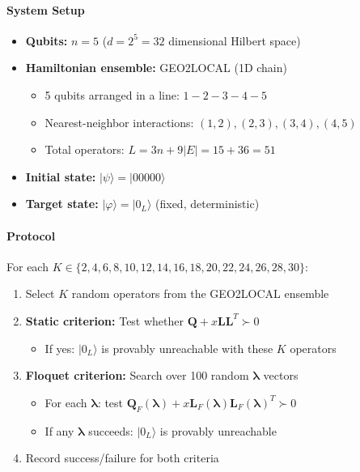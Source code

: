 \paragraph{System Setup}
\begin{itemize}
\item \textbf{Qubits:} $n = 5$ ($d = 2^5 = 32$ dimensional Hilbert space)
\item \textbf{Hamiltonian ensemble:} GEO2LOCAL (1D chain)
  \begin{itemize}
  \item 5 qubits arranged in a line: $1-2-3-4-5$
  \item Nearest-neighbor interactions: $(1,2), (2,3), (3,4), (4,5)$
  \item Total operators: $L = 3n + 9|E| = 15 + 36 = 51$
  \end{itemize}
\item \textbf{Initial state:} $|\psi\rangle = |00000\rangle$
\item \textbf{Target state:} $|\varphi\rangle = |0_L\rangle$ (fixed, deterministic)
\end{itemize}

\paragraph{Protocol}

For each $K \in \{2, 4, 6, 8, 10, 12, 14, 16, 18, 20, 22, 24, 26, 28, 30\}$:
\begin{enumerate}
\item Select $K$ random operators from the GEO2LOCAL ensemble
\item \textbf{Static criterion:} Test whether $\mathbf{Q} + x \mathbf{L} \mathbf{L}^T \succ 0$
  \begin{itemize}
  \item If yes: $|0_L\rangle$ is provably unreachable with these $K$ operators
  \end{itemize}
\item \textbf{Floquet criterion:} Search over 100 random $\boldsymbol{\lambda}$ vectors
  \begin{itemize}
  \item For each $\boldsymbol{\lambda}$: test $\mathbf{Q}_F(\boldsymbol{\lambda}) + x \mathbf{L}_F(\boldsymbol{\lambda}) \mathbf{L}_F(\boldsymbol{\lambda})^T \succ 0$
  \item If any $\boldsymbol{\lambda}$ succeeds: $|0_L\rangle$ is provably unreachable
  \end{itemize}
\item Record success/failure for both criteria
\end{enumerate}

